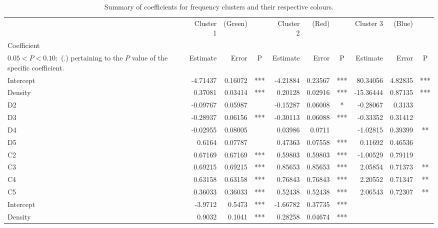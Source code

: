 \documentclass[11pt,letterpaper]{article}
\numberwithin{equation}{section}
\numberwithin{equation}{section}
\numberwithin{equation}{section}
\begin{document}
\begin{center}
\begin{table}
\caption{Summary of coefficients for frequency clusters and their respective colours.}
\label{frequencySummary}
\begin{tabular}{|l|rrc|rrc|rrc|}
\hline\hline
          & Cluster 1 & (Green) &   & Cluster 2 & (Red) &  & Cluster 3 & (Blue) &   \\
Coefficient \footnote{The significance codes are defined as $  P < 0.001 : $  (***), $0.001 < P < 0.01:$ (**), $  0.01 < P < 0.05:$ (*),\\ $0.05 < P < 0.10 : $ (.) %
pertaining to the $P$ value of the specific coefficient.}             & Estimate  & Error & P   & Estimate  & Error   & P   & Estimate  & Error  & P  \\
 \hline
Intercept & -4.71437 & 0.16072 & *** & -4.21884 & 0.23567 & *** & 80.34056  & 4.82835 & *** \\
Density   & 0.37081  & 0.03414 & *** & 0.20128  & 0.02916 & *** & -15.36444 & 0.87135 & *** \\
D2        & -0.09767 & 0.05987 &     & -0.15287 & 0.06008 & *   & -0.28067  & 0.3133  &     \\
D3        & -0.28937 & 0.06156 & *** & -0.30113 & 0.06088 & *** & -0.33352  & 0.31412 &     \\
D4        & -0.02955 & 0.08005 &     & 0.03986  & 0.0711  &     & -1.02815  & 0.39399 & **  \\
D5        & 0.6164   & 0.07787 &     & 0.47363  & 0.07558 & *** & 0.11692   & 0.46536 &     \\
C2        & 0.67169  & 0.67169 & *** & 0.59803  & 0.59803 & *** & -1.00529  & 0.79119 &     \\
C3        & 0.69215  & 0.69215 & *** & 0.85653  & 0.85653 & *** & 2.05854   & 0.71373 & **  \\
C4        & 0.63158  & 0.63158 & *** & 0.76843  & 0.76843 & *** & 2.20552   & 0.71347 & **  \\
C5        & 0.36033  & 0.36033 & *** & 0.52438  & 0.52438 & *** & 2.06543   & 0.72307 & **  \\
\hline
Intercept & -3.9712  & 0.5473  & *** & -1.66782 & 0.37735 & *** &           &         &     \\
Density   & 0.9032   & 0.1041  & *** & 0.28258  & 0.04674 & *** &           &         &    \\
\hline\hline
\end{tabular}
\end{table}
\end{center}

\newpage


\end{document}
